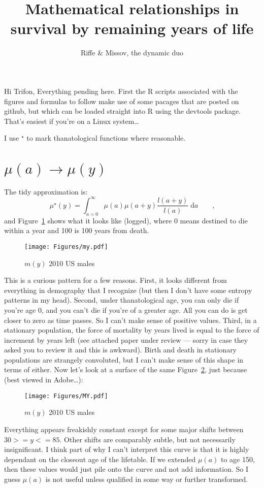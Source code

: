 \documentclass{article}
\newcommand{\dd}{\; \mathrm{d}}
\newcommand{\ec}{\quad\quad\text{,}}
\begin{document}
\title{Mathematical relationships in survival by remaining years of life}
\author{Riffe \& Missov, the dynamic duo}
\maketitle

Hi Trifon,
Everything pending here. First the R scripts associated with the figures and
formulas to follow make use of some pacages that are posted on github, but which
can be loaded straight into R using the devtools package. That's easiest if
you're on a Linux system\ldots

I use $^\star$ to mark thanatological functions where reasonable.
\section{$\mu (a) \rightarrow \mu (y)$}

The tidy approximation is:
\begin{equation}
\mu^\star (y) = \int _{a=0}^\infty \mu (a) \mu (a+y) \frac{l(a+y)}{l(a)} \dd
a\ec
\end{equation}
and Figure~\ref{fig:my} shows what it looks like (logged), where 0 means
destined to die within a year and 100 is 100 years from death.

\begin{figure}[ht!]
\caption{$m(y)$ 2010 US males}
\label{fig:my}
\texttt{[image: Figures/my.pdf]}
\end{figure}

This is a curious pattern for a few reasons. First, it looks different from
everything in demography that I recognize (but then I don't have some entropy
patterns in my head). Second, under thanatological age, you can only die if
you're age 0, and you can't die if you're of a greater age. All you can do is get closer to zero as time passes. So I can't make sense of positive values. Third, in a
stationary population, the force of mortality by years lived is equal to the force of increment by years left (see
attached paper under review --- sorry in case they asked you to review it and
this is awkward). Birth and death in stationary populations are strangely
convoluted, but I can't make sense of this shape in terms of either. Now let's
look at a surface of the same Figure~\ref{fig:MY}, just because (best viewed in
Adobe\ldots):
\begin{figure}[ht!]
\caption{$m(y)$ 2010 US males}
\label{fig:MY}
\texttt{[image: Figures/MY.pdf]}
\end{figure}
Everything appears freakishly constant except for some major shifts between $30
>= y <= 85$. Other shifts are comparably subtle, but not necessarily
insignificant. I think part of why I can't interpret this curve is that it is
highly dependant on the closeout age of the lifetable. If we extended $\mu (a)$
to age 150, then these values would just pile onto the curve and not add
information. So I guess $\mu (a)$ is not useful unless qualified in some way or
further transformed. 
\end{document}
